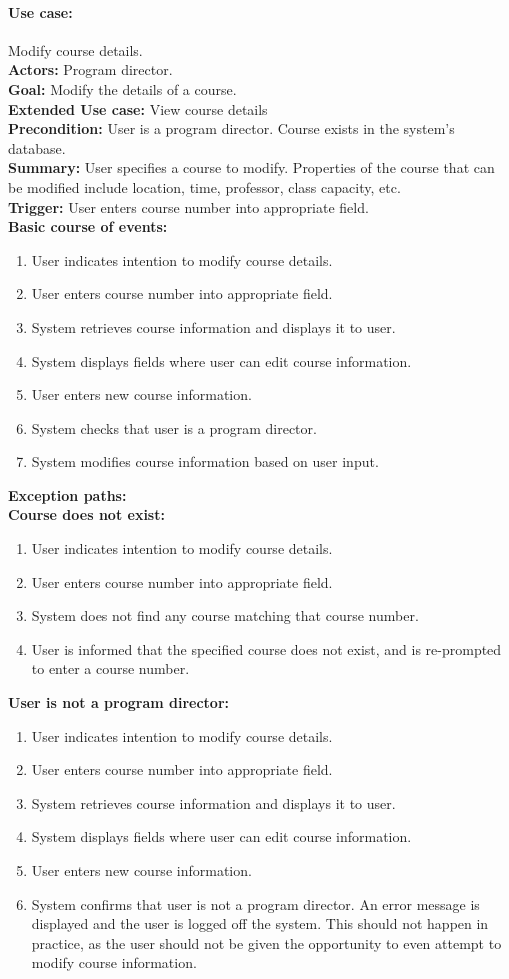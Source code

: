 \documentclass[12pt]{article}
\begin{document}
\paragraph*{Use case:} Modify course details.\\
\textbf{Actors:} Program director.\\
\textbf{Goal:} Modify the details of a course.\\
\textbf{Extended Use case:} View course details\\
\textbf{Precondition:} User is a program director. Course exists in the system's database.\\
\textbf{Summary:} User specifies a course to modify. Properties of the course that can be modified include location, time, professor, class capacity, etc.\\
\textbf{Trigger:} User enters course number into appropriate field.\\
\textbf{Basic course of events:}
\begin{enumerate}
\item User indicates intention to modify course details.
\item User enters course number into appropriate field.
\item System retrieves course information and displays it to user.
\item System displays fields where user can edit course information.
\item User enters new course information.
\item System checks that user is a program director.
\item System modifies course information based on user input.
\end{enumerate}
\textbf{Exception paths:}\\
\textbf{Course does not exist:}
\begin{enumerate}
\item User indicates intention to modify course details.
\item User enters course number into appropriate field.
\item System does not find any course matching that course number.
\item User is informed that the specified course does not exist, and is re-prompted
to enter a course number.
\end{enumerate}
\textbf{User is not a program director:}
\begin{enumerate}
\item User indicates intention to modify course details.
\item User enters course number into appropriate field.
\item System retrieves course information and displays it to user.
\item System displays fields where user can edit course information.
\item User enters new course information.
\item System confirms that user is not a program director. An error message is displayed
and the user is logged off the system. This should not happen in practice, as the
user should not be given the opportunity to even attempt to modify course information.
\end{enumerate}
\end{document}
